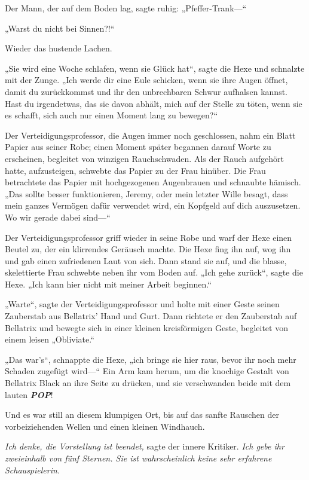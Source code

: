 {Der Mann, der auf dem Boden lag, sagte ruhig: „Pfeffer-Trank—“

„Warst du nicht bei Sinnen?!“

Wieder das hustende Lachen.

„Sie wird eine Woche schlafen, wenn sie Glück hat“, sagte die Hexe und schnalzte mit der Zunge. „Ich werde dir eine Eule schicken, wenn sie ihre Augen öffnet, damit du zurückkommst und ihr den unbrechbaren Schwur aufhalsen kannst. Hast du irgendetwas, das sie davon abhält, mich auf der Stelle zu töten, wenn sie es schafft, sich auch nur einen Moment lang zu bewegen?“

Der Verteidigungsprofessor, die Augen immer noch geschlossen, nahm ein Blatt Papier aus seiner Robe; einen Moment später begannen darauf Worte zu erscheinen, begleitet von winzigen Rauchschwaden. Als der Rauch aufgehört hatte, aufzusteigen, schwebte das Papier zu der Frau hinüber. Die Frau betrachtete das Papier mit hochgezogenen Augenbrauen und schnaubte hämisch. „Das sollte besser funktionieren, Jeremy, oder mein letzter Wille besagt, dass mein ganzes Vermögen dafür verwendet wird, ein Kopfgeld auf dich auszusetzen. Wo wir gerade dabei sind—“

Der Verteidigungsprofessor griff wieder in seine Robe und warf der Hexe einen Beutel zu, der ein klirrendes Geräusch machte. Die Hexe fing ihn auf, wog ihn und gab einen zufriedenen Laut von sich. Dann stand sie auf, und die blasse, skelettierte Frau schwebte neben ihr vom Boden auf. „Ich gehe zurück“, sagte die Hexe. „Ich kann hier nicht mit meiner Arbeit beginnen.“

„Warte“, sagte der Verteidigungsprofessor und holte mit einer Geste seinen Zauberstab aus Bellatrix' Hand und Gurt. Dann richtete er den Zauberstab auf Bellatrix und bewegte sich in einer kleinen kreisförmigen Geste, begleitet von einem leisen „Obliviate.“

„Das war's“, schnappte die Hexe, „ich bringe sie hier raus, bevor ihr noch mehr Schaden zugefügt wird—“ Ein Arm kam herum, um die knochige Gestalt von Bellatrix Black an ihre Seite zu drücken, und sie verschwanden beide mit dem lauten \textbf{\emph{POP}}!

Und es war still an diesem klumpigen Ort, bis auf das sanfte Rauschen der vorbeiziehenden Wellen und einen kleinen Windhauch.

\emph{Ich denke, die Vorstellung ist beendet,} sagte der innere Kritiker. \emph{Ich gebe ihr zweieinhalb von fünf Sternen. Sie ist wahrscheinlich keine sehr erfahrene Schauspielerin.}

}
